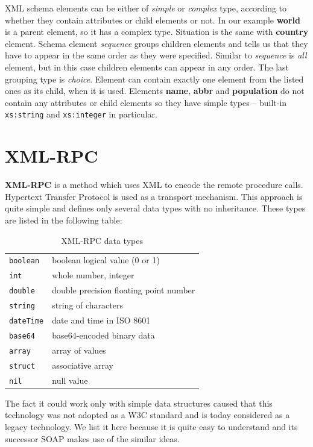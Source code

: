 \documentclass[12pt,notitlepage]{report}
\begin{document}
XML schema elements can be either of \textit{simple} or \textit{complex} type, according to whether they contain attributes or child elements or not. In our example \textbf{world} is a parent element, so it has a complex type. Situation is the same with \textbf{country} element. Schema element \textit{sequence} groups children elements and tells us that they have to appear in the same order as they were specified. Similar to \textit{sequence} is \textit{all} element, but in this case children elements can appear in any order. The last grouping type is \textit{choice}. Element can contain exactly one element from the listed ones as its child, when it is used. Elements \textbf{name}, \textbf{abbr} and \textbf{population} do not contain any attributes or child elements so they have simple types -- built-in \texttt{xs:string} and \texttt{xs:integer} in particular.

\section{XML-RPC}
\label{xml-rpc}
\textbf{XML-RPC} is a method which uses XML to encode the remote procedure calls. Hypertext Transfer Protocol is used as a transport mechanism. This approach is quite simple and defines only several data types with no inheritance. These types are listed in the following table:

\begin{table}[htb]
\begin{center}
\renewcommand{\arraystretch}{1.3}
\begin{tabular}{ll}
\texttt{boolean} & boolean logical value (0 or 1)\\
\texttt{int} & whole number, integer\\
\texttt{double} & double precision floating point number\\
\texttt{string} & string of characters\\
\texttt{dateTime} & date and time in ISO 8601\\
\texttt{base64} & base64-encoded binary data\\
\texttt{array} & array of values\\
\texttt{struct} & associative array\\
\texttt{nil} & null value
\end{tabular}
\end{center}
\caption{XML-RPC data types}
\end{table}

The fact it could work only with simple data structures caused that this technology was not adopted as a W3C standard and is today considered as a legacy technology. We list it here because it is quite easy to understand and its successor SOAP makes use of the similar ideas.
\end{document}
